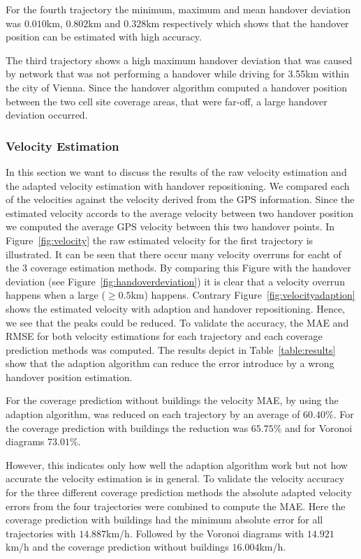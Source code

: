 For the fourth trajectory the minimum, maximum and mean handover deviation was $0.010$km, $0.802$km and $0.328$km respectively which shows that the handover position can be estimated with high accuracy.

The third trajectory shows a high maximum handover deviation that was caused by network that was not performing a handover while driving for 3.55km within the city of Vienna. Since the handover algorithm computed a handover position between the two cell site coverage areas, that were far-off, a large handover deviation occurred.
\subsubsection{Velocity Estimation}
In this section we want to discuss the results of the raw velocity estimation and the adapted velocity estimation with handover repositioning. We compared each of the velocities against the velocity derived from the GPS information. Since the estimated velocity accords to the average velocity between two handover position we computed the average GPS velocity between this two handover points. In Figure~\ref{fig:velocity} the raw estimated velocity for the first trajectory is illustrated. It can be seen that there occur many velocity overruns for eacht of the 3 coverage estimation methods. By comparing this Figure with the handover deviation (see Figure~\ref{fig:handoverdeviation}) it is clear that a velocity overrun happens when a large ($\ge0.5$km) happens. Contrary Figure~\ref{fig:velocityadaption} shows the estimated velocity with adaption and handover repositioning. Hence, we see that the peaks could be reduced. To validate the accuracy, the MAE and RMSE for both velocity estimations for each trajectory and each coverage prediction methods was computed. The results depict in Table~\ref{table:results} show that the adaption algorithm can reduce the error introduce by a wrong handover position estimation.

For the coverage prediction without buildings the velocity MAE, by using the adaption algorithm, was reduced on each trajectory by an average of $60.40\%$. For the coverage prediction with buildings the reduction was $65.75\%$ and for Voronoi diagrams $73.01\%$. 

However, this indicates only how well the adaption algorithm work but not how accurate the velocity estimation is in general. To validate the velocity accuracy for the three different coverage prediction methods the absolute adapted velocity errors from the four trajectories were combined to compute the MAE. Here the coverage prediction with buildings had the minimum absolute error for all trajectories with $14.887$km/h. Followed by the Voronoi diagrams with $14.921$km/h and the coverage prediction without buildings $16.004$km/h. 

